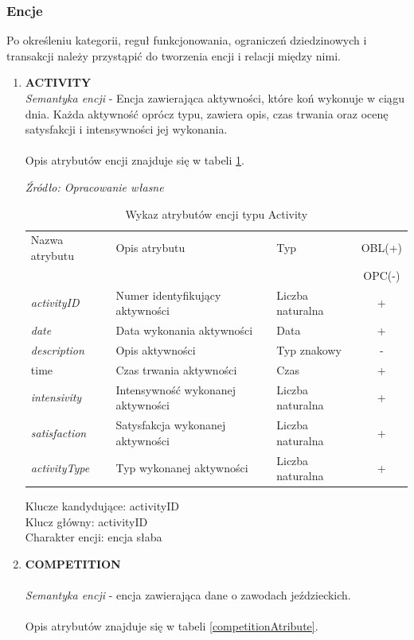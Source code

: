 \documentclass[12pt,twoside]{report}
\begin{document}
\subsubsection{Encje}
Po określeniu kategorii, reguł funkcjonowania, ograniczeń dziedzinowych i transakcji należy przystąpić do tworzenia encji i relacji między nimi.
\\

\begin{enumerate}[start=1,label={\bfseries ENC\textbackslash0\arabic*}]
	\item \textbf{ACTIVITY} \\
	\textit{Semantyka encji} - Encja zawierająca aktywności, które koń wykonuje w ciągu dnia. Każda aktywność oprócz typu, zawiera opis, czas trwania oraz ocenę satysfakcji i intensywności jej wykonania.
	\\ \\
	Opis atrybutów encji znajduje się w tabeli \ref{ActivityAtribute}.
	
	\begin{table}[H]
		\caption{Wykaz atrybutów encji typu Activity }
		\textit{Źródło: Opracowanie własne}
		\label{ActivityAtribute}
		\centering
		\begin{tabular}{|l|l|l|c|}
			\hline
			Nazwa atrybutu & Opis atrybutu & Typ & OBL(+) \\
			& & &  OPC(-) \\
			\hline
			\textit{activityID} & Numer identyfikujący aktywności & Liczba naturalna & + \\
			\hline
			\textit{date} & Data wykonania aktywności & Data & + \\
			\hline
			\textit{description} & Opis aktywności & Typ znakowy & - \\
			\hline
			time &  Czas trwania aktywności & Czas & + \\
			\hline
			\textit{intensivity} & Intensywność wykonanej aktywności & Liczba naturalna & + \\
			\hline
			\textit{satisfaction} & Satysfakcja wykonanej aktywności & Liczba naturalna & + \\
			\hline
			\textit{activityType} &  Typ wykonanej aktywności & Liczba naturalna & + \\
			\hline
		\end{tabular}
	\end{table}
	Klucze kandydujące: activityID \\
	Klucz główny: activityID \\
	Charakter encji: encja słaba \\
	\item \textbf{COMPETITION}\\ \\
	\textit{Semantyka encji} - encja zawierająca dane o zawodach jeździeckich. 
	\\ \\
	Opis atrybutów znajduje się w tabeli \ref{competitionAtribute}.
	

\end{enumerate}
\end{document}
